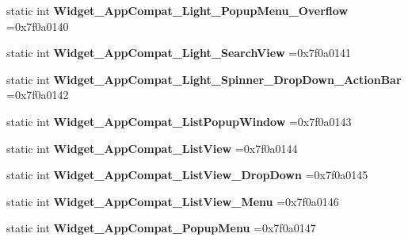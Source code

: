 \begin{DoxyCompactItemize}
static int {\bfseries Widget\+\_\+\+App\+Compat\+\_\+\+Light\+\_\+\+Popup\+Menu\+\_\+\+Overflow} =0x7f0a0140
\item 
\mbox{\label{classandroid_1_1support_1_1design_1_1R_1_1style_aa64bee6e1bf03f771bd5a7a1f2f31ec7}} 
static int {\bfseries Widget\+\_\+\+App\+Compat\+\_\+\+Light\+\_\+\+Search\+View} =0x7f0a0141
\item 
\mbox{\label{classandroid_1_1support_1_1design_1_1R_1_1style_a63148ca0a84c1892ea242d50bb576eae}} 
static int {\bfseries Widget\+\_\+\+App\+Compat\+\_\+\+Light\+\_\+\+Spinner\+\_\+\+Drop\+Down\+\_\+\+Action\+Bar} =0x7f0a0142
\item 
\mbox{\label{classandroid_1_1support_1_1design_1_1R_1_1style_adb4646075c36b658a141c6d3e60539c3}} 
static int {\bfseries Widget\+\_\+\+App\+Compat\+\_\+\+List\+Popup\+Window} =0x7f0a0143
\item 
\mbox{\label{classandroid_1_1support_1_1design_1_1R_1_1style_a753fd6668d734112c3228973aab33793}} 
static int {\bfseries Widget\+\_\+\+App\+Compat\+\_\+\+List\+View} =0x7f0a0144
\item 
\mbox{\label{classandroid_1_1support_1_1design_1_1R_1_1style_a607a2030341f4b892800d0ffb3e6ebaa}} 
static int {\bfseries Widget\+\_\+\+App\+Compat\+\_\+\+List\+View\+\_\+\+Drop\+Down} =0x7f0a0145
\item 
\mbox{\label{classandroid_1_1support_1_1design_1_1R_1_1style_a102df2c57b2b3ab8239dd20419dc7c49}} 
static int {\bfseries Widget\+\_\+\+App\+Compat\+\_\+\+List\+View\+\_\+\+Menu} =0x7f0a0146
\item 
\mbox{\label{classandroid_1_1support_1_1design_1_1R_1_1style_a546bb86d8d54602b5208f34a42afa371}} 
static int {\bfseries Widget\+\_\+\+App\+Compat\+\_\+\+Popup\+Menu} =0x7f0a0147
\item 
\mbox{\label{classandroid_1_1support_1_1design_1_1R_1_1style_aa92da8787c059760dfbe4feaed94a6fd}} 

\end{DoxyCompactItemize}
